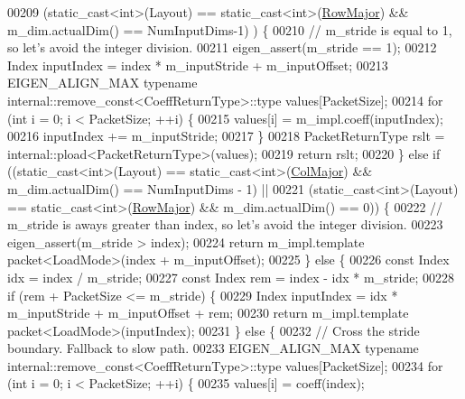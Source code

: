 \begin{DoxyCode}
00209     (static\_cast<int>(Layout) == \textcolor{keyword}{static\_cast<}\textcolor{keywordtype}{int}\textcolor{keyword}{>}(\hyperlink{group__enums_ggaacded1a18ae58b0f554751f6cdf9eb13acfcde9cd8677c5f7caf6bd603666aae3}{RowMajor}) && m\_dim.actualDim() == NumInputDims-1)
      ) \{
00210       \textcolor{comment}{// m\_stride is equal to 1, so let's avoid the integer division.}
00211       eigen\_assert(m\_stride == 1);
00212       Index inputIndex = index * m\_inputStride + m\_inputOffset;
00213       EIGEN\_ALIGN\_MAX \textcolor{keyword}{typename} internal::remove\_const<CoeffReturnType>::type values[PacketSize];
00214       \textcolor{keywordflow}{for} (\textcolor{keywordtype}{int} i = 0; i < PacketSize; ++i) \{
00215         values[i] = m\_impl.coeff(inputIndex);
00216         inputIndex += m\_inputStride;
00217       \}
00218       PacketReturnType rslt = internal::pload<PacketReturnType>(values);
00219       \textcolor{keywordflow}{return} rslt;
00220     \} \textcolor{keywordflow}{else} \textcolor{keywordflow}{if} ((static\_cast<int>(Layout) == static\_cast<int>(\hyperlink{group__enums_ggaacded1a18ae58b0f554751f6cdf9eb13a0cbd4bdd0abcfc0224c5fcb5e4f6669a}{ColMajor}) && m\_dim.actualDim() == 
      NumInputDims - 1) ||
00221            (static\_cast<int>(Layout) == \textcolor{keyword}{static\_cast<}\textcolor{keywordtype}{int}\textcolor{keyword}{>}(\hyperlink{group__enums_ggaacded1a18ae58b0f554751f6cdf9eb13acfcde9cd8677c5f7caf6bd603666aae3}{RowMajor}) && m\_dim.actualDim() == 0)) \{
00222       \textcolor{comment}{// m\_stride is aways greater than index, so let's avoid the integer division.}
00223       eigen\_assert(m\_stride > index);
00224       \textcolor{keywordflow}{return} m\_impl.template packet<LoadMode>(index + m\_inputOffset);
00225     \} \textcolor{keywordflow}{else} \{
00226       \textcolor{keyword}{const} Index idx = index / m\_stride;
00227       \textcolor{keyword}{const} Index rem = index - idx * m\_stride;
00228       \textcolor{keywordflow}{if} (rem + PacketSize <= m\_stride) \{
00229         Index inputIndex = idx * m\_inputStride + m\_inputOffset + rem;
00230         \textcolor{keywordflow}{return} m\_impl.template packet<LoadMode>(inputIndex);
00231       \} \textcolor{keywordflow}{else} \{
00232         \textcolor{comment}{// Cross the stride boundary. Fallback to slow path.}
00233         EIGEN\_ALIGN\_MAX \textcolor{keyword}{typename} internal::remove\_const<CoeffReturnType>::type values[PacketSize];
00234         \textcolor{keywordflow}{for} (\textcolor{keywordtype}{int} i = 0; i < PacketSize; ++i) \{
00235           values[i] = coeff(index);

\end{DoxyCode}
